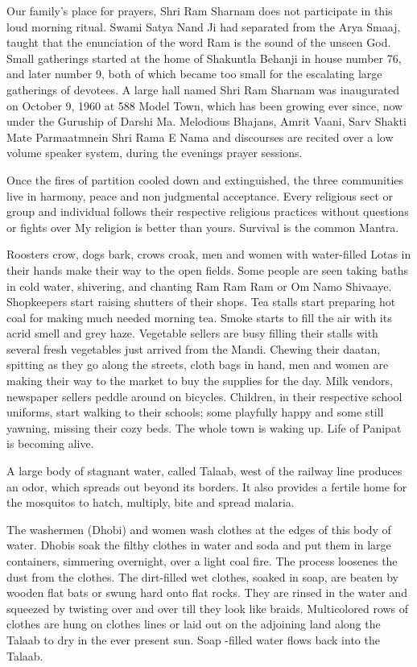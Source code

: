 Our family's place for prayers, Shri Ram Sharnam does not participate in
this loud morning ritual. Swami Satya Nand Ji had separated from the Arya
Smaaj, taught that the enunciation of the word Ram is the sound of the
unseen God. Small gatherings started at the home of Shakuntla Behanji in
house number 76, and later number 9, both of which became too small for
the escalating large gatherings of devotees. A large hall named Shri Ram
Sharnam was inaugurated on October 9, 1960 at 588 Model Town, which has
been growing ever since, now under the Guruship of Darshi Ma. Melodious
Bhajans, Amrit Vaani, Sarv Shakti Mate Parmaatmnein Shri Rama E Nama and
discourses are recited over a low volume speaker system, during the
evenings prayer sessions. 

Once the fires of partition cooled down and extinguished, the three
communities live in harmony, peace and non judgmental acceptance. Every
religious sect or group and individual follows their respective religious
practices without questions or fights over My religion is better than
yours. Survival is the common Mantra. 

Roosters crow, dogs bark, crows croak, men and women with water-filled
Lotas in their hands make their way to the open fields. Some people are
seen taking baths in cold water, shivering, and chanting Ram Ram Ram or Om
Namo Shivaaye. Shopkeepers start raising shutters of their shops. Tea
stalls start preparing hot coal for making much needed morning tea. Smoke
starts to fill the air with its acrid smell and grey haze. Vegetable
sellers are busy filling their stalls with several fresh vegetables just
arrived from the Mandi. Chewing their daatan, spitting as they go along
the streets, cloth bags in hand, men and women are making their way to the
market to buy the supplies for the day. Milk vendors, newspaper sellers
peddle around on bicycles. Children, in their respective school uniforms,
start walking to their schools; some playfully happy and some still
yawning, missing their cozy beds. The whole town is waking up. Life of
Panipat is becoming alive. 

A large body of stagnant water, called Talaab, west of the railway line
produces an odor, which spreads out beyond its borders. It also provides
a fertile home for the mosquitos to hatch, multiply, bite and spread
malaria. 

The washermen (Dhobi) and women wash clothes at the edges of this body of
water. Dhobis soak the filthy clothes in water and soda and put them in
large containers, simmering overnight, over a light coal fire. The process
loosenes the dust from the clothes. The dirt-filled wet clothes, soaked in
soap, are beaten by wooden flat bats or swung hard onto flat rocks. They
are rinsed in the water and squeezed by twisting over and over till they
look like braids. Multicolored rows of clothes are hung on clothes lines
or laid out on the adjoining land along the Talaab to dry in the ever
present sun. Soap -filled water flows back into the Talaab. 

